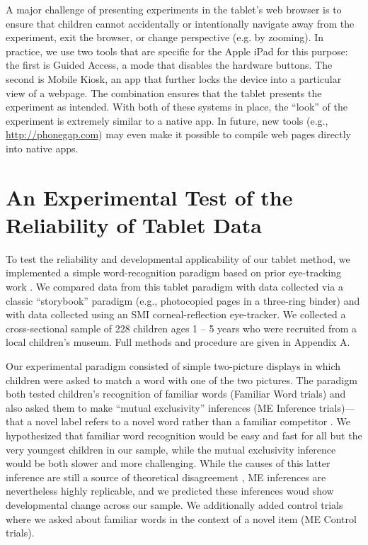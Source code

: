 \documentclass[man,noapacite]{apa2}
\begin{document}
A major challenge of presenting experiments in the tablet's web browser is to ensure that children cannot accidentally or intentionally navigate away from the experiment, exit the browser, or change perspective (e.g. by zooming). In practice, we use two tools that are specific for the Apple iPad for this purpose: the first is Guided Access, a mode that disables the hardware buttons. The second is Mobile Kiosk, an app that further locks the device into a particular view of a webpage. The combination ensures that the tablet presents the experiment as intended. With both of these systems in place, the ``look'' of the experiment is extremely similar to a native app. In future, new tools (e.g., \url{http://phonegap.com}) may even make it possible to compile web pages directly into native apps.

\section{An Experimental Test of the Reliability of Tablet Data}
 
To test the reliability and developmental applicability of our tablet method, we implemented a simple word-recognition paradigm based on prior eye-tracking work \cite{fernald1998,fernald2006,bion2013}. We compared data from this tablet paradigm with data collected via a classic ``storybook'' paradigm (e.g., photocopied pages in a three-ring binder) and with data collected using an SMI corneal-reflection eye-tracker. We collected a cross-sectional sample of 228 children ages 1 -- 5 years who were recruited from a local children's museum. Full methods and procedure are given in Appendix A. 

Our experimental paradigm consisted of simple two-picture displays in which children were asked to match a word with one of the two pictures. The paradigm both tested children's recognition of familiar words (Familiar Word trials) and also asked them to make ``mutual exclusivity''  inferences  (ME Inference trials)---that a novel label refers to a novel word rather than a familiar competitor \cite{markman1988}. We hypothesized that familiar word recognition would be easy and fast for all but the very youngest children in our sample, while the mutual exclusivity inference would be both slower and more challenging. While the causes of this latter inference are still a source of theoretical disagreement \cite{markman2003,diesendruck2001,frank2009,bion2013}, ME inferences are nevertheless highly replicable, and we predicted these inferences woud show developmental change across our sample. We additionally added control trials where we asked about familiar words in the context of a novel item (ME Control trials).
\end{document}
